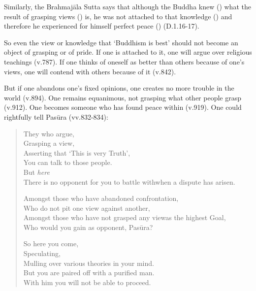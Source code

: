 Similarly, the Brahmajāla Sutta says that although the Buddha knew () what the result of grasping views () is, he was not attached to that knowledge () and therefore he experienced for himself perfect peace () (D.1.16-17).

So even the view or knowledge that `Buddhism is best' should not become an object of grasping or of pride. If one is attached to it, one will argue over religious teachings (v.787). If one thinks of oneself as better than others because of one's views, one will contend with others because of it (v.842).

But if one abandons one's fixed opinions, one creates no more trouble in the world (v.894). One remains equanimous, not grasping what other people grasp (v.912). One becomes someone who has found peace within (v.919). One could rightfully tell Pasūra (vv.832-834):

\clearpage

\begin{verse}
 They who argue,\\
Grasping a view,\\
Asserting that `This is very Truth',\\
You can talk to those people.\\
But \emph{here}\\
There is no opponent for you to battle with\newline when a dispute has arisen.

 Amongst those who have abandoned confrontation,\\
Who do not pit one view against another,\\
Amongst those who have not grasped any view\newline as the highest Goal,\\
Who would you gain as opponent, Pasūra?

 So here you come,\\
Speculating,\\
Mulling over various theories in your mind.\\
But you are paired off with a purified man.\\
With him you will not be able to proceed.
\end{verse}
